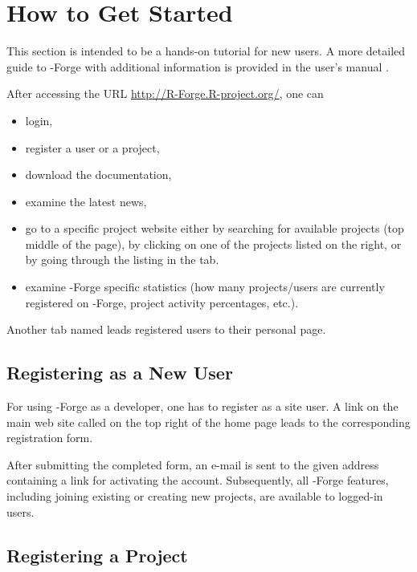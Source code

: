 \section{How to Get Started}
This section is intended to be a hands-on tutorial for new users. A
more detailed guide to \R{}-Forge with additional 
information is provided in the user's manual
\citep{forge:usermanual:2008}.

After accessing the URL \url{http://R-Forge.R-project.org/}, one can
\begin{itemize}
\item login,
\item register a user or a project,
\item download the documentation,
\item examine the latest news,
\item go to a specific project website either by searching for available
  projects (top middle of the page), by clicking on one of the projects
  listed on the right, or by going through the listing in
  the  tab. 
\item examine \R{}-Forge specific statistics (how many projects/users
  are currently registered on \R{}-Forge, project activity percentages,
  etc.).
\end{itemize}

Another tab named  leads registered users
to their personal page.

\subsection{Registering as a New User}

For using \R{}-Forge as a developer, one has
to register as a site user. A link on the main web site called
 on the top right of the home page leads to the
corresponding registration form.

After submitting the completed form, an e-mail is sent to the given
address containing a link for activating the account. Subsequently,
all \R{}-Forge features, including joining existing or creating
new projects, are available to logged-in users.

\subsection{Registering a Project}

